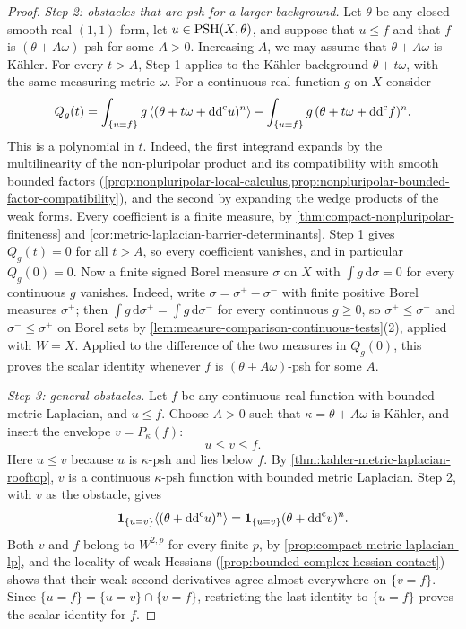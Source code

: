 \begin{proof}
\emph{Step 2: obstacles that are psh for a larger background.} Let $\theta$ be any closed smooth real $(1,1)$-form, let $u\in\mathrm{PSH}(X,\theta)$, and suppose that $u\leq f$ and that $f$ is $(\theta+A\omega)$-psh for some $A>0$. Increasing $A$, we may assume that $\theta+A\omega$ is K\"ahler. For every $t>A$, Step 1 applies to the K\"ahler background $\theta+t\omega$, with the same measuring metric $\omega$. For a continuous real function $g$ on $X$ consider
\[
 Q_g(t)=\int_{\{u=f\}}g\,
        \langle(\theta+t\omega+\mathrm{dd}^{\mathrm{c}} u)^n\rangle
        -\int_{\{u=f\}}g\,(\theta+t\omega+\mathrm{dd}^{\mathrm{c}} f)^n.
\]
This is a polynomial in $t$. Indeed, the first integrand expands by the multilinearity of the non-pluripolar product and its compatibility with smooth bounded factors (\cref{prop:nonpluripolar-local-calculus,prop:nonpluripolar-bounded-factor-compatibility}), and the second by expanding the wedge products of the weak forms. Every coefficient is a finite measure, by \cref{thm:compact-nonpluripolar-finiteness} and \cref{cor:metric-laplacian-barrier-determinants}. Step 1 gives $Q_g(t)=0$ for all $t>A$, so every coefficient vanishes, and in particular $Q_g(0)=0$. Now a finite signed Borel measure $\sigma$ on $X$ with $\int g\,\mathrm d\sigma=0$ for every continuous $g$ vanishes. Indeed, write $\sigma=\sigma^+-\sigma^-$ with finite positive Borel measures $\sigma^\pm$; then $\int g\,\mathrm d\sigma^+=\int g\,\mathrm d\sigma^-$ for every continuous $g\geq0$, so $\sigma^+\leq\sigma^-$ and $\sigma^-\leq\sigma^+$ on Borel sets by \cref{lem:measure-comparison-continuous-tests}(2), applied with $W=X$. Applied to the difference of the two measures in $Q_g(0)$, this proves the scalar identity whenever $f$ is $(\theta+A\omega)$-psh for some $A$.

\emph{Step 3: general obstacles.} Let $f$ be any continuous real function with bounded metric Laplacian, and $u\leq f$. Choose $A>0$ such that $\kappa=\theta+A\omega$ is K\"ahler, and insert the envelope $v=P_\kappa(f)$:
\[
 u\leq v\leq f.
\]
Here $u\leq v$ because $u$ is $\kappa$-psh and lies below $f$. By \cref{thm:kahler-metric-laplacian-rooftop}, $v$ is a continuous $\kappa$-psh function with bounded metric Laplacian. Step 2, with $v$ as the obstacle, gives
\[
 \mathbf1_{\{u=v\}}\langle(\theta+\mathrm{dd}^{\mathrm{c}} u)^n\rangle
   =\mathbf1_{\{u=v\}}(\theta+\mathrm{dd}^{\mathrm{c}} v)^n.
\]
Both $v$ and $f$ belong to $W^{2,p}$ for every finite $p$, by \cref{prop:compact-metric-laplacian-lp}, and the locality of weak Hessians (\cref{prop:bounded-complex-hessian-contact}) shows that their weak second derivatives agree almost everywhere on $\{v=f\}$. Since $\{u=f\}=\{u=v\}\cap\{v=f\}$, restricting the last identity to $\{u=f\}$ proves the scalar identity for $f$.


\end{proof}
